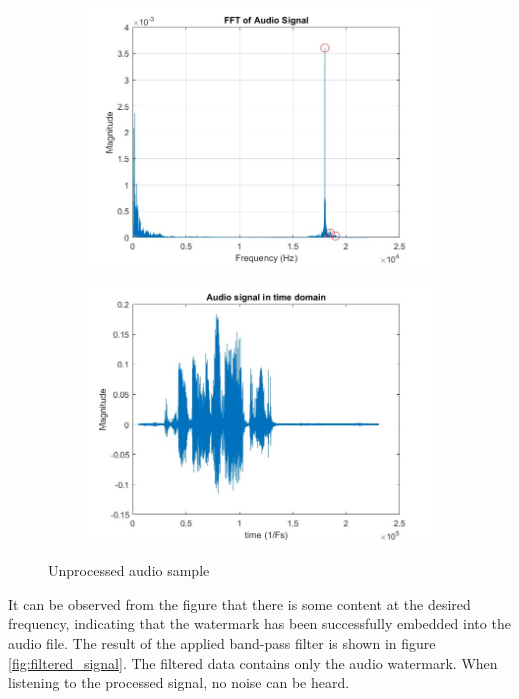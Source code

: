 \begin{figure}[H]
    \centering
    \begin{subfigure}{0.48\textwidth}
    \includegraphics[width=\textwidth]{LiveAudioWatermarking/images/FFT_raw.jpg}
    \caption{}
    \label{fftraw}
    \end{subfigure}%
    \hfill
     \begin{subfigure}{0.48\textwidth}
    \includegraphics[width=\textwidth]{LiveAudioWatermarking/images/sig_td_raw.jpg}
    \caption{}
    \label{rawsig}
    \end{subfigure}
    \caption{Unprocessed audio sample}
    \label{fig:raw_signal}
\end{figure}
It can be observed from the figure that there is some content at the desired frequency, indicating that the watermark has been successfully embedded into the audio file.
The result of the applied band-pass filter is shown in figure \ref{fig:filtered_signal}. The filtered data contains only the audio watermark. When listening to the processed signal, no noise can be heard.


